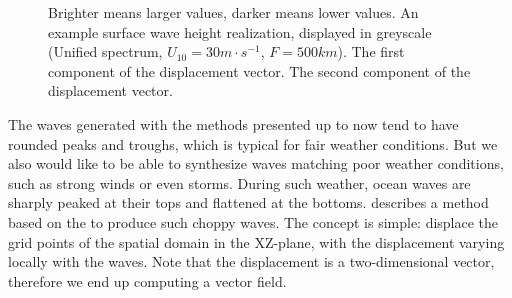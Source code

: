 \begin{figure}
{ }
 \hfill
\caption[A wave height realization with its corresponding displacements.]{
Brighter means larger values, darker means lower values.
 An example surface wave height
realization, displayed in greyscale (Unified spectrum, $U_{10}=30m\cdot s^{-1}$, $F=500km$).
 The first component of the displacement vector.
 The second component of the displacement vector.
}
\label{fig:displacements}
\end{figure}
%
The waves generated with the methods presented up to now tend to have rounded peaks and troughs,
which is typical for fair weather conditions. But we also would like to be able to synthesize waves
matching poor weather conditions, such as strong winds or even storms. During such weather, ocean waves
are sharply peaked at their tops and flattened at the bottoms. \citet{course:simulatingocean}
describes a method based on the \FourierTransform to produce such choppy waves. The concept is simple: displace
the grid points of the spatial domain in the XZ-plane, with the displacement varying locally with the waves.
Note that the displacement is a two-dimensional vector, therefore we end up computing a vector field.
